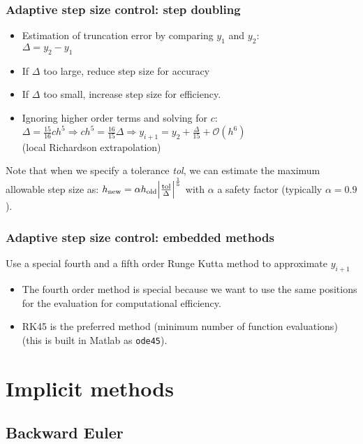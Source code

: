 \documentclass[11pt,table,final,fleqn,xcolor={usenames,dvipsnames,table}]{beamer}
\begin{document}
\begin{frame}
  \frametitle{Adaptive step size control: step doubling}
\begin{itemize}
  \item Estimation of truncation error by comparing $y_1$ and $y_2$:\\
  $\Delta = y_2 - y_1$
  \item If $\Delta$ too large, reduce step size for accuracy
  \item If $\Delta$ too small, increase step size for efficiency.
  \item Ignoring higher order terms and solving for $c$:
  $ \Delta = \frac{15}{16}ch^5 \Rightarrow ch^5 = \frac{16}{15} \Delta \Rightarrow y_{i+1} = y_2 + \frac{\Delta}{15} + \mathcal{O}{(h^6)}$ \\ (local Richardson extrapolation)
\end{itemize}
  Note that when we specify a tolerance \emph{tol}, we can estimate the maximum allowable step size as:
  $ h_\text{new} = \alpha h_\text{old} \abs{\frac{\text{tol}}{\Delta}}^{\frac{1}{5}}$ with $\alpha$ a safety factor (typically $\alpha = 0.9$).
\end{frame}

\begin{frame}
  \frametitle{Adaptive step size control: embedded methods}
  Use a special fourth and a fifth order Runge Kutta method to approximate $y_{i+1}$
  \begin{itemize}
    \item The fourth order method is special because we want to use the same positions for the evaluation for computational efficiency.
    \item RK45 is the preferred method (minimum number of function evaluations) (this is built in Matlab as \lstinline$ode45$).
  \end{itemize}
\end{frame}

\section{Implicit methods}
\subsection{Backward Euler}
\end{document}
